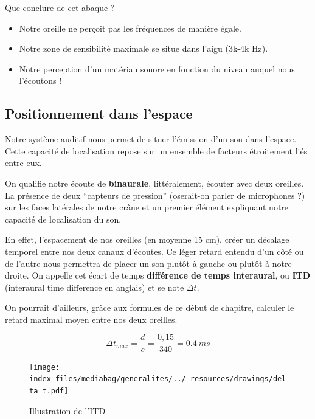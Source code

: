 \documentclass[
  letterpaper,
  DIV=11,
  numbers=noendperiod]{scrreprt}
\providecommand{\tightlist}{%
  \setlength{\itemsep}{0pt}\setlength{\parskip}{0pt}}\usepackage{longtable,booktabs,array}
\begin{document}
Que conclure de cet abaque ?

\begin{itemize}
\tightlist
\item
  Notre oreille ne perçoit pas les fréquences de manière égale.
\item
  Notre zone de sensibilité maximale se situe dans l'aigu (3k-4k Hz).
\item
  Notre perception d'un matériau sonore en fonction du niveau auquel
  nous l'écoutons !
\end{itemize}

\hypertarget{positionnement-dans-lespace}{%
\subsection{Positionnement dans
l'espace}\label{positionnement-dans-lespace}}

Notre système auditif nous permet de situer l'émission d'un son dans
l'espace. Cette capacité de localisation repose sur un ensemble de
facteurs étroitement liés entre eux.

On qualifie notre écoute de \textbf{binaurale}, littéralement, écouter
avec deux oreilles. La présence de deux ``capteurs de pression''
(oserait-on parler de microphones ?) sur les faces latérales de notre
crâne et un premier élément expliquant notre capacité de localisation du
son.

En effet, l'espacement de nos oreilles (en moyenne 15 cm), créer un
décalage temporel entre nos deux canaux d'écoutes. Ce léger retard
entendu d'un côté ou de l'autre nous permettra de placer un son plutôt à
gauche ou plutôt à notre droite. On appelle cet écart de temps
\textbf{différence de temps interaural}, ou \textbf{ITD} (interaural
time difference en anglais) et se note \(\Delta t\).

On pourrait d'ailleurs, grâce aux formules de ce début de chapitre,
calculer le retard maximal moyen entre nos deux oreilles.

\[\Delta t_{max} = \frac d c = \frac {0,15}{340} = 0.4 \> ms\]

\begin{figure}

{\centering \texttt{[image: index\_files/mediabag/generalites/../\_resources/drawings/delta\_t.pdf]}

}

\caption{\label{fig-delta_t}Illustration de l'ITD}

\end{figure}
\end{document}

